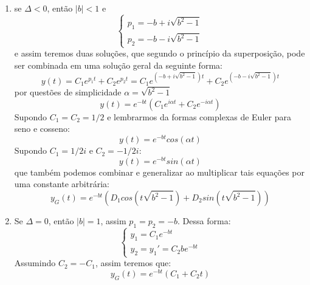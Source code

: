 \begin{enumerate}[I]
    \item se $\Delta<0$, então $|b|<1$ e
    \begin{equation*}
        \begin{cases}
            p_1 = -b + i\sqrt{b^2-1}\\
            p_2 = -b - i\sqrt{b^2-1}
        \end{cases}
    \end{equation*}
    e assim teremos duas soluções, que segundo o princípio da superposição, pode ser combinada em uma solução geral da seguinte forma: 
    \begin{equation*}
        y(t) = C_1e^{p_1t} + C_2e^{p_2t} = C_1e^{(-b + i\sqrt{b^2-1})t} + C_2e^{( -b - i\sqrt{b^2-1})t}
    \end{equation*}
    por questões de simplicidade $\alpha = \sqrt{b^2-1}$
    \begin{equation*}
        y(t) =  e^{-bt}(C_1e^{i\alpha t} + C_2e^{-i\alpha t})
    \end{equation*}
    Supondo $C_1 = C_2 = 1/2$ e lembrarmos da formas complexas de Euler para seno e cosseno:
    \begin{equation*}
        y(t) =  e^{-bt}cos(\alpha t)
    \end{equation*}
    Supondo $C_1 = 1/2i$ e $C_2 = -1/2i$:
    \begin{equation*}
        y(t) =  e^{-bt}sin(\alpha t)
    \end{equation*}
    que também podemos combinar e generalizar ao multiplicar tais equações por uma constante arbitrária:
    \begin{equation*}
        \boxed{y_G(t) = e^{-bt}(D_1cos(t\sqrt{b^2-1}) + D_2sin(t\sqrt{b^2-1}))}
    \end{equation*}
    
    \item Se $\Delta = 0$, então $|b| = 1$, assim $p_1 = p_2 = -b$. Dessa forma:
    \begin{equation*}
        \begin{cases}
            y_1 = C_1e^{-bt}\\
            y_2 = y_1' = C_2be^{-bt}
        \end{cases}
    \end{equation*}
    Assumindo $C_2=-C_1$, assim teremos que:
    \begin{equation*}
       \boxed{ y_G(t) = e^{-bt}(C_1 + C_2t)}
    \end{equation*}
    

\end{enumerate}
